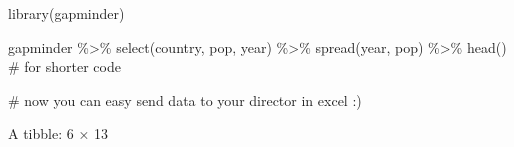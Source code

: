 \documentclass[
  letterpaper,
  DIV=11,
  numbers=noendperiod]{scrreprt}
\newenvironment{Shaded}{\begin{snugshade}}{\end{snugshade}}
\newcommand{\CommentTok}[1]{\textcolor[rgb]{0.37,0.37,0.37}{#1}}
\newcommand{\FunctionTok}[1]{\textcolor[rgb]{0.28,0.35,0.67}{#1}}
\newcommand{\NormalTok}[1]{\textcolor[rgb]{0.00,0.23,0.31}{#1}}
\newcommand{\SpecialCharTok}[1]{\textcolor[rgb]{0.37,0.37,0.37}{#1}}
\begin{document}
\begin{Shaded}
\begin{Highlighting}[]
\FunctionTok{library}\NormalTok{(gapminder)}
\end{Highlighting}
\end{Shaded}

\begin{Shaded}
\begin{Highlighting}[]
\NormalTok{gapminder }\SpecialCharTok{\%\textgreater{}\%} \FunctionTok{select}\NormalTok{(country, pop, year) }\SpecialCharTok{\%\textgreater{}\%}
                \FunctionTok{spread}\NormalTok{(year, pop) }\SpecialCharTok{\%\textgreater{}\%}
                \FunctionTok{head}\NormalTok{() }\CommentTok{\# for shorter code}

\CommentTok{\# now you can easy send data to your director in excel :)}
\end{Highlighting}
\end{Shaded}

A tibble: 6 × 13
\end{document}
